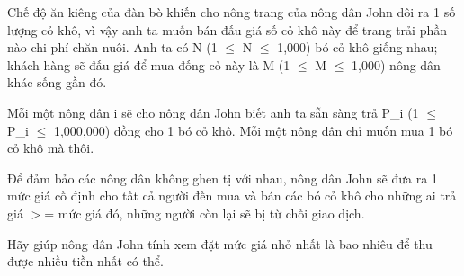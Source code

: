Chế độ ăn kiêng của đàn bò khiến cho nông trang của nông dân John dôi ra 1 số lượng cỏ khô, vì vậy anh ta muốn bán đấu giá số cỏ khô này để trang trải phần nào chi phí chăn nuôi. Anh ta có N (1  $\le$  N  $\le$  1,000) bó cỏ khô giống nhau; khách hàng sẽ đấu giá để mua đống cỏ này là M (1  $\le$  M  $\le$  1,000) nông dân khác sống gần đó.  

   Mỗi một nông dân i sẽ cho nông dân John biết anh ta sẵn sàng trả P\_i (1  $\le$  P\_i  $\le$  1,000,000) đồng cho 1 bó cỏ khô. Mỗi một nông dân chỉ muốn mua 1 bó cỏ khô mà thôi.  

   Để đảm bảo các nông dân không ghen tị với nhau, nông dân John sẽ đưa ra 1 mức giá cố định cho tất cả người đến mua và bán các bó cỏ khô cho những ai trả giá $>$= mức giá đó, những người còn lại sẽ bị từ chối giao dịch.  

   Hãy giúp nông dân John tính xem đặt mức giá nhỏ nhất là bao nhiêu để thu được nhiều tiền nhất có thể.  

\
